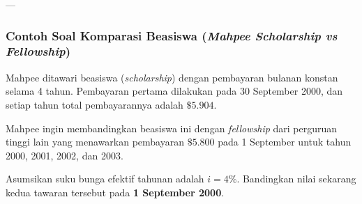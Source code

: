 \documentclass[11pt,a4paper]{article}
\begin{document}
---

\subsubsection{Contoh Soal Komparasi Beasiswa (\textit{Mahpee Scholarship vs Fellowship})}

\begin{examplebox}
Mahpee ditawari beasiswa (\textit{scholarship}) dengan pembayaran bulanan konstan selama 4 tahun. Pembayaran pertama dilakukan pada 30 September 2000, dan setiap tahun total pembayarannya adalah $\$5.904$. 

Mahpee ingin membandingkan beasiswa ini dengan \textit{fellowship} dari perguruan tinggi lain yang menawarkan pembayaran $\$5.800$ pada 1 September untuk tahun 2000, 2001, 2002, dan 2003.

Asumsikan suku bunga efektif tahunan adalah $i = 4\%$. Bandingkan nilai sekarang kedua tawaran tersebut pada \textbf{1 September 2000}.
\end{examplebox}
\end{document}
